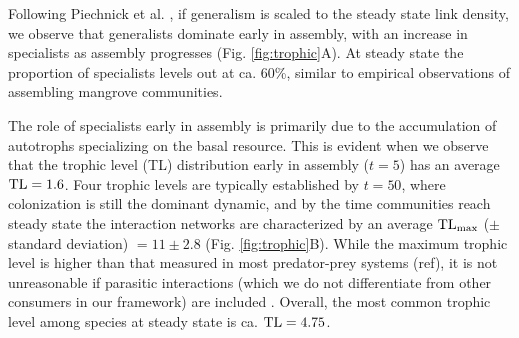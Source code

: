 \documentclass[9pt,twocolumn,twoside]{pnas-new}
\newcommand{\rr}[1]{{\rm #1}}
\begin{document}
Following Piechnick et al. \cite{Piechnik2008}, if generalism is scaled to the steady state link density, we observe that generalists dominate early in assembly, with an increase in specialists as assembly progresses (Fig. \ref{fig:trophic}A).
At steady state the proportion of specialists levels out at ca. 60\%, similar to empirical observations of assembling mangrove communities.


The role of specialists early in assembly is primarily due to the accumulation of autotrophs specializing on the basal resource.
This is evident when we observe that the trophic level (TL) distribution early in assembly ($t=5$) has an average ${\rm TL}=1.6$.
Four trophic levels are typically established by $t=50$, where colonization is still the dominant dynamic, and by the time communities reach steady state the interaction networks are characterized by an average ${\rm TL_{max}}$ ($\pm$ standard deviation) $=11 \pm 2.8$ (Fig. \ref{fig:trophic}B).
While the maximum trophic level is higher than that measured in most predator-prey systems (ref), it is not unreasonable if parasitic interactions (which we do not differentiate from other consumers in our framework) are included \cite{Lafferty2006}.
Overall, the most common trophic level among species at steady state is ca. ${\rm TL}=4.75$.
\end{document}
